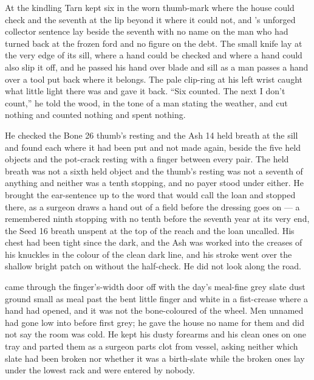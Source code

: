 \scenebreak

At the kindling Tarn kept six in the worn thumb-mark where the house could check and the seventh at the lip beyond it where it could not, and 's unforged collector sentence lay beside the seventh with no name on the man who had turned back at the frozen ford and no figure on the debt. The small knife lay at the very edge of its sill, where a hand could be checked and where a hand could also slip it off, and he passed his hand over blade and sill as a man passes a hand over a tool put back where it belongs. The pale clip-ring at his left wrist caught what little light there was and gave it back. “Six counted. The next I don't count,” he told the wood, in the tone of a man stating the weather, and cut nothing and counted nothing and spent nothing.

He checked the Bone 26 thumb's resting and the Ash 14 held breath at the sill and found each where it had been put and not made again, beside the five held objects and the pot-crack resting with a finger between every pair. The held breath was not a sixth held object and the thumb's resting was not a seventh of anything and neither was a tenth stopping, and no payer stood under either. He brought the ear-sentence up to the word that would call the loan and stopped there, as a surgeon draws a hand out of a field before the dressing goes on --- a remembered ninth stopping with no tenth before the seventh year at its very end, the Seed 16 breath unspent at the top of the reach and the loan uncalled. His chest had been tight since the dark, and the Ash was worked into the creases of his knuckles in the colour of the clean dark line, and his stroke went over the shallow bright patch on  without the half-check. He did not look along the road.

 came through the finger's-width door off  with the day's meal-fine grey slate dust ground small as meal past the bent little finger and white in a fist-crease where a hand had opened, and it was not the bone-coloured  of the wheel. Men unnamed had gone low into  before first grey; he gave the house no name for them and did not say the room was cold. He kept his dusty forearms and his clean ones on one tray and parted them as a surgeon parts clot from vessel, asking neither which slate had been broken nor whether it was a birth-slate while the broken ones lay under the lowest rack and were entered by nobody.

